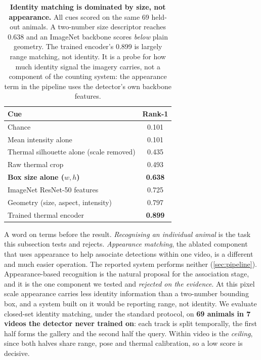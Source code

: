 \begin{table}[htbp]
\caption{\textbf{Identity matching is dominated by size, not appearance.} All cues scored on
the same 69 held-out animals. A two-number size descriptor reaches 0.638 and an ImageNet
backbone scores \emph{below} plain geometry. The trained encoder's 0.899 is largely range
matching, not identity. It is a probe for how much identity signal the imagery carries, not
a component of the counting system: the appearance term in the pipeline uses the detector's
own backbone features.\label{tab:reid}}
\centering
\begin{tabularx}{\textwidth}{lC}
\toprule
\textbf{Cue} & \textbf{Rank-1} \\
\midrule
Chance & 0.101 \\
Mean intensity alone & 0.101 \\
Thermal silhouette alone (scale removed) & 0.435 \\
Raw thermal crop & 0.493 \\
\textbf{Box size alone ($w,h$)} & \textbf{0.638} \\
ImageNet ResNet-50 features & 0.725 \\
Geometry (size, aspect, intensity) & 0.797 \\
Trained thermal encoder & \textbf{0.899} \\
\bottomrule
\end{tabularx}
\end{table}

A word on terms before the result. \emph{Recognising an individual animal} is the task this
subsection tests and rejects. \emph{Appearance matching}, the ablated component that uses
appearance to help associate detections within one video, is a different and much easier
operation. The reported system performs neither (\cref{sec:pipeline}). Appearance-based
recognition is the natural proposal for the association stage, and it is the one component
we tested and \emph{rejected on the evidence}. At this pixel scale appearance carries less
identity information than a two-number bounding box, and a system built on it would be
reporting range, not identity. We evaluate closed-set identity matching, under the standard protocol, on \textbf{69 animals
in 7 videos the detector never trained on}: each track is split temporally, the first half
forms the gallery and the second half the query. Within video is the \emph{ceiling}, since
both halves share range, pose and thermal calibration, so a low score is decisive.

